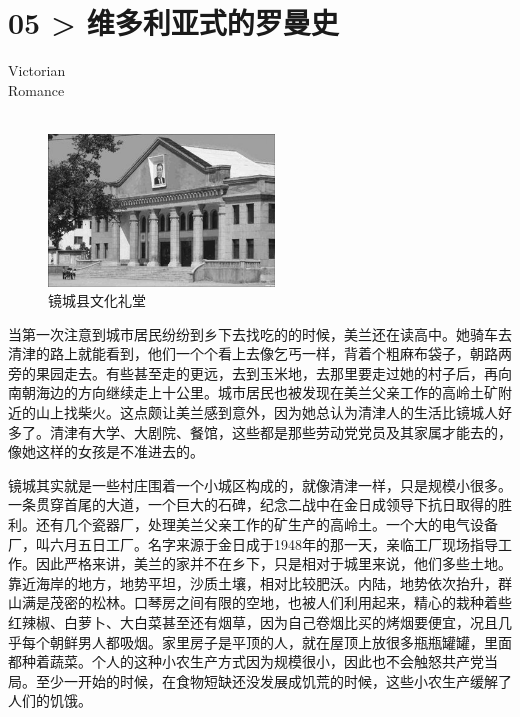 \chapter*{05 > 维多利亚式的罗曼史}
\vspace{5mm}
\begin{flushright}
	\textcolor{PinYinColor}{\EN \huge{Victorian\\
			Romance\\
			\ \\}}
\end{flushright}

\begin{figure}[!htbp]
	\centering
	\includegraphics[width=6cm]{./Chapters/Images/05.jpg}
	\caption*{镜城县文化礼堂}
\end{figure}

当第一次注意到城市居民纷纷到乡下去找吃的的时候，美兰还在读高中。她骑车去清津的路上就能看到，他们一个个看上去像乞丐一样，背着个粗麻布袋子，朝路两旁的果园走去。有些甚至走的更远，去到玉米地，去那里要走过她的村子后，再向南朝海边的方向继续走上十公里。城市居民也被发现在美兰父亲工作的高岭土矿附近的山上找柴火。这点颇让美兰感到意外，因为她总认为清津人的生活比镜城人好多了。清津有大学、大剧院、餐馆，这些都是那些劳动党党员及其家属才能去的，像她这样的女孩是不准进去的。

镜城其实就是一些村庄围着一个小城区构成的，就像清津一样，只是规模小很多。一条贯穿首尾的大道，一个巨大的石碑，纪念二战中在金日成领导下抗日取得的胜利。还有几个瓷器厂，处理美兰父亲工作的矿生产的高岭土。一个大的电气设备厂，叫六月五日工厂。名字来源于金日成于1948年的那一天，亲临工厂现场指导工作。因此严格来讲，美兰的家并不在乡下，只是相对于城里来说，他们多些土地。靠近海岸的地方，地势平坦，沙质土壤，相对比较肥沃。内陆，地势依次抬升，群山满是茂密的松林。口琴房之间有限的空地，也被人们利用起来，精心的栽种着些红辣椒、白萝卜、大白菜甚至还有烟草，因为自己卷烟比买的烤烟要便宜，况且几乎每个朝鲜男人都吸烟。家里房子是平顶的人，就在屋顶上放很多瓶瓶罐罐，里面都种着蔬菜。个人的这种小农生产方式因为规模很小，因此也不会触怒共产党当局。至少一开始的时候，在食物短缺还没发展成饥荒的时候，这些小农生产缓解了人们的饥饿。

